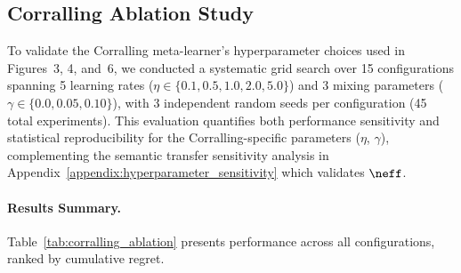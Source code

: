 
\subsection{Corralling Ablation Study}
\label{sec:appendix_corralling_ablation}

To validate the Corralling meta-learner's hyperparameter choices used in Figures~3, 4, and~6, we conducted a systematic grid search over 15 configurations spanning 5 learning rates ($\eta \in \{0.1, 0.5, 1.0, 2.0, 5.0\}$) and 3 mixing parameters ($\gamma \in \{0.0, 0.05, 0.10\}$), with 3 independent random seeds per configuration (45 total experiments).
This evaluation quantifies both performance sensitivity and statistical reproducibility for the Corralling-specific parameters ($\eta$, $\gamma$), complementing the semantic transfer sensitivity analysis in Appendix~\ref{appendix:hyperparameter_sensitivity} which validates $\neff$.

\paragraph{Results Summary.}
Table~\ref{tab:corralling_ablation} presents performance across all configurations, ranked by cumulative regret.

